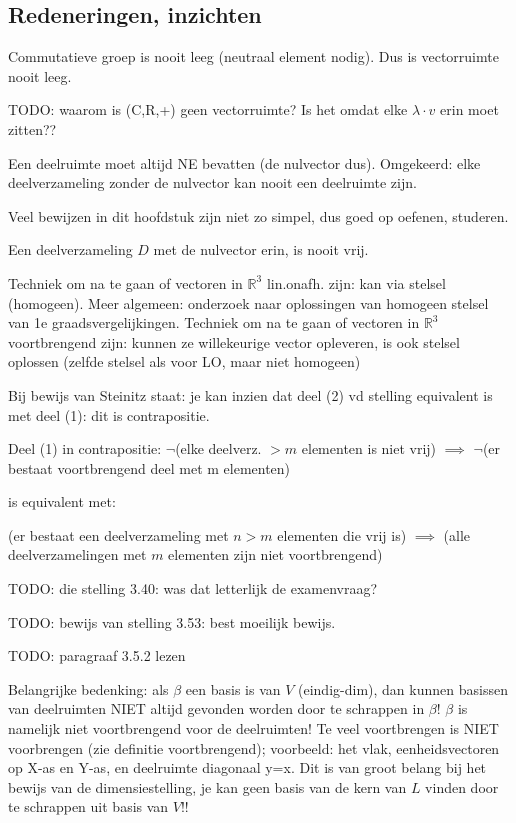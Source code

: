 \documentclass{article}
\begin{document}
\subsection{Redeneringen, inzichten}

Commutatieve groep is nooit leeg (neutraal element nodig). Dus is vectorruimte nooit leeg. 

TODO: waarom is (C,R,+) geen vectorruimte? Is het omdat elke $\lambda \cdot v$ erin moet zitten?? 

Een deelruimte moet altijd NE bevatten (de nulvector dus). Omgekeerd: elke deelverzameling zonder de nulvector kan nooit een deelruimte zijn. 

Veel bewijzen in dit hoofdstuk zijn niet zo simpel, dus goed op oefenen, studeren. 

Een deelverzameling $D$ met de nulvector erin, is nooit vrij. 

Techniek om na te gaan of vectoren in $\mathbb{R}^3$ lin.onafh. zijn: kan via stelsel (homogeen). Meer algemeen: onderzoek naar oplossingen van homogeen stelsel van 1e graadsvergelijkingen. 
Techniek om na te gaan of vectoren in $\mathbb{R}^3$ voortbrengend zijn: kunnen ze willekeurige vector opleveren, is ook stelsel oplossen (zelfde stelsel als voor LO, maar niet homogeen) 

Bij bewijs van Steinitz staat: je kan inzien dat deel (2) vd stelling equivalent is met deel (1): dit is contrapositie. 

Deel (1) in contrapositie: 
$\neg$(elke deelverz. $> m$ elementen is niet vrij) $\implies$ $\neg$(er bestaat voortbrengend deel met m elementen)

is equivalent met: 

(er bestaat een deelverzameling met $n>m$ elementen die vrij is) $\implies$ (alle deelverzamelingen met $m$ elementen zijn niet voortbrengend)

TODO: die stelling 3.40: was dat letterlijk de examenvraag? 

TODO: bewijs van stelling 3.53: best moeilijk bewijs. 

TODO: paragraaf 3.5.2 lezen 


Belangrijke bedenking: als $\beta$ een basis is van $V$ (eindig-dim), dan kunnen basissen van deelruimten NIET altijd gevonden worden door te schrappen in $\beta$! $\beta$ is namelijk niet voortbrengend voor de deelruimten! Te veel voortbrengen is NIET voorbrengen (zie definitie voortbrengend); voorbeeld: het vlak, eenheidsvectoren op X-as en Y-as, en deelruimte diagonaal y=x. 
Dit is van groot belang bij het bewijs van de dimensiestelling, je kan geen basis van de kern van $L$ vinden door te schrappen uit basis van $V$!! 
\end{document}
